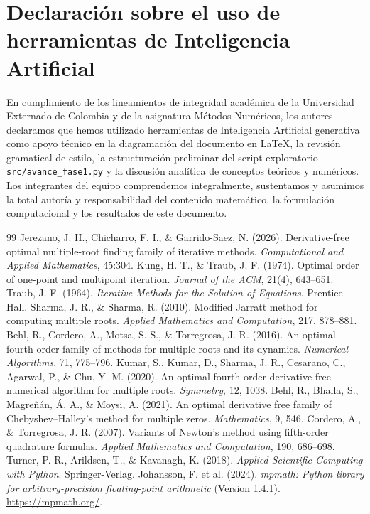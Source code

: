 \documentclass[10pt, a4paper]{article}
\begin{document}
\section*{Declaración sobre el uso de herramientas de Inteligencia Artificial}
\small
En cumplimiento de los lineamientos de integridad académica de la Universidad Externado de Colombia y de la asignatura Métodos Numéricos, los autores declaramos que hemos utilizado herramientas de Inteligencia Artificial generativa como apoyo técnico en la diagramación del documento en \LaTeX{}, la revisión gramatical de estilo, la estructuración preliminar del script exploratorio \texttt{src/avance\_fase1.py} y la discusión analítica de conceptos teóricos y numéricos. Los integrantes del equipo comprendemos integralmente, sustentamos y asumimos la total autoría y responsabilidad del contenido matemático, la formulación computacional y los resultados de este documento.

\begin{thebibliography}{99}
\footnotesize
\setlength{\itemsep}{-0.5pt}
 Jerezano, J. H., Chicharro, F. I., \& Garrido-Saez, N. (2026). Derivative-free optimal multiple-root finding family of iterative methods. \textit{Computational and Applied Mathematics}, 45:304.
 Kung, H. T., \& Traub, J. F. (1974). Optimal order of one-point and multipoint iteration. \textit{Journal of the ACM}, 21(4), 643--651.
 Traub, J. F. (1964). \textit{Iterative Methods for the Solution of Equations}. Prentice-Hall.
 Sharma, J. R., \& Sharma, R. (2010). Modified Jarratt method for computing multiple roots. \textit{Applied Mathematics and Computation}, 217, 878--881.
 Behl, R., Cordero, A., Motsa, S. S., \& Torregrosa, J. R. (2016). An optimal fourth-order family of methods for multiple roots and its dynamics. \textit{Numerical Algorithms}, 71, 775--796.
 Kumar, S., Kumar, D., Sharma, J. R., Cesarano, C., Agarwal, P., \& Chu, Y. M. (2020). An optimal fourth order derivative-free numerical algorithm for multiple roots. \textit{Symmetry}, 12, 1038.
 Behl, R., Bhalla, S., Magreñán, Á. A., \& Moysi, A. (2021). An optimal derivative free family of Chebyshev--Halley's method for multiple zeros. \textit{Mathematics}, 9, 546.
 Cordero, A., \& Torregrosa, J. R. (2007). Variants of Newton’s method using fifth-order quadrature formulas. \textit{Applied Mathematics and Computation}, 190, 686--698.
 Turner, P. R., Arildsen, T., \& Kavanagh, K. (2018). \textit{Applied Scientific Computing with Python}. Springer-Verlag.
 Johansson, F. et al. (2024). \textit{mpmath: Python library for arbitrary-precision floating-point arithmetic} (Version 1.4.1). \url{https://mpmath.org/}.
\end{thebibliography}
\end{document}
